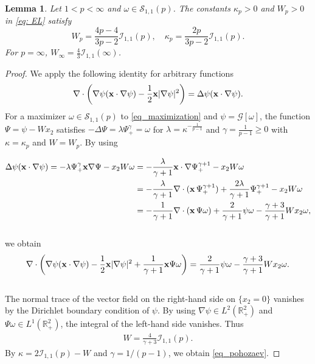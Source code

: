 \documentclass[11pt]{amsart}
\newtheorem{lemma}[theorem]{Lemma}
\theoremstyle{definition}
\theoremstyle{definition}
\numberwithin{equation}{section}
\newcommand{\0}{\emptyset}
\newcommand{\bfx}{{\bf x}}
\newcommand{\calI}{\mathcal I}
\newcommand{\calS}{\mathcal S}
\begin{document}
			\begin{lemma}
				\label{lem_pohozaev}
				Let $1<p< \infty$ and $\omega \in \calS_{1, 1}(p)$.
				The constants $\kappa_p  > 0$ and $W_p> 0$ in \eqref{eq: EL} satisfy 
				\begin{equation}
					\label{eq_pohozaev}
					W_p=\frac{4p-4}{3p-2}\calI_{1,1}(p),\quad \kappa_p =\frac{2p}{3p-2} \calI_{1,1}(p).
				\end{equation}
				For $p=\infty$, $W_{\infty}=\frac{4}{3}\calI_{1,1}(\infty)$.
			\end{lemma}
			
			
			
			\begin{proof}  
				We apply the following identity for arbitrary functions
				\begin{align*}
					\nabla \cdot \left(\nabla \psi (\bfx \cdot \nabla \psi)-\frac{1}{2} \bfx |\nabla \psi|^{2} \right)
					=\Delta \psi (\bfx \cdot \nabla \psi).
				\end{align*}
				For a maximizer $\omega\in \calS_{1,1}({p})$ to \eqref{eq_maximization} and $\psi=\mathcal{G}[\omega]$, the function $\Psi=\psi-Wx_2$ satisfies $-\Delta \Psi=\lambda \Psi_{+}^{\gamma}=\omega$ for $\lambda=\kappa^{-\frac{1}{p-1}}$ and $\gamma=\frac{1}{p-1}\geq 0$ with $\kappa=\kappa_{p}$ and $W=W_{p}$. By using 
				
				\begin{align*}
					\Delta \psi (\bfx \cdot \nabla \psi) = -\lambda \Psi_{+}^{\gamma} \bfx \nabla \Psi-x_2W\omega
					&=-\frac{\lambda}{\gamma+1} \bfx \cdot \nabla \Psi_{+}^{\gamma+1}-x_2W\omega \\
					&=-\frac{\lambda}{\gamma+1}\nabla \cdot (\bfx \,\Psi_{+}^{\gamma+1})
					+\frac{2\lambda}{\gamma+1} \Psi_{+}^{\gamma+1}
					-x_2W\omega \\
					&=-\frac{1}{\gamma+1}\nabla \cdot (\bfx \, \Psi \omega)+\frac{2}{\gamma+1}\psi\omega-\frac{\gamma+3}{\gamma+1}Wx_2\omega,
				\end{align*}\\
				we obtain 
				\begin{align*}
					\nabla \cdot \left(\nabla \psi (\bfx\cdot \nabla \psi)-\frac{1}{2}\bfx |\nabla \psi|^{2} +\frac{1}{\gamma+1}  \bfx  \Psi \omega \right)=\frac{2}{\gamma+1}\psi\omega-\frac{\gamma+3}{\gamma+1}Wx_2\omega.
				\end{align*}\\
				The normal trace of the vector field on the right-hand side on $\{x_2=0\}$ vanishes by the Dirichlet boundary condition of $\psi$. By using $\nabla \psi\in L^{2}(\mathbb{R}^{2}_{+})$ and $\Psi \omega \in L^{1}(\mathbb{R}^{2}_{+})$, the integral of the left-hand side vanishes. Thus 
				\begin{align*}
					W=\frac{4}{\gamma+3}\calI_{1,1}(p).
				\end{align*}
				By $\kappa=2\calI_{1,1}(p)-W$ and $\gamma=1/(p-1)$, we obtain \eqref{eq_pohozaev}.
			\end{proof}
			
\end{document}
